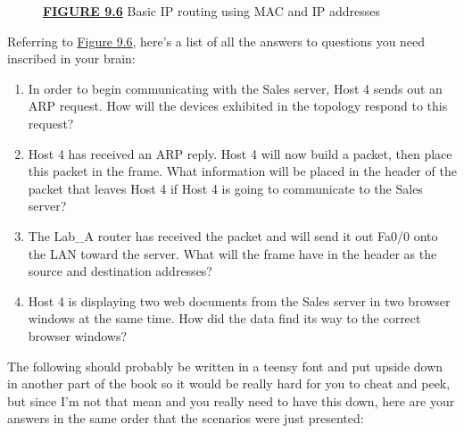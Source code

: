 \protect\hypertarget{c09.xhtmlux5cux23Page_370}{}{}

\begin{figure}
\centering
\caption{{\protect\hyperlink{c09.xhtmlux5cux23figureanchor9-6}{\textbf{FIGURE
9.6}} Basic IP routing using MAC and IP addresses}}
\end{figure}

Referring to \protect\hyperlink{c09.xhtmlux5cux23figure9-6}{Figure 9.6},
here's a list of all the answers to questions you need inscribed in your
brain:

\begin{enumerate}
\tightlist
\item
  In order to begin communicating with the Sales server, Host 4 sends
  out an ARP request. How will the devices exhibited in the topology
  respond to this request?
\item
  Host 4 has received an ARP reply. Host 4 will now build a packet, then
  place this packet in the frame. What information will be placed in the
  header of the packet that leaves Host 4 if Host 4 is going to
  communicate to the Sales server?
\item
  The Lab\_A router has received the packet and will send it out Fa0/0
  onto the LAN toward the server. What will the frame have in the header
  as the source and destination addresses?
\item
  Host 4 is displaying two web documents from the Sales server in two
  browser windows at the same time. How did the data find its way to the
  correct browser windows?
\end{enumerate}

The following should probably be written in a teensy font and put upside
down in another part of the book so it would be really hard for you to
cheat and peek, but since I'm not that mean and you really need to have
this down, here are your answers in the same order that the scenarios
were just presented:

